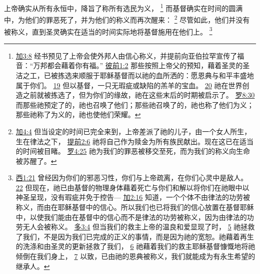 \documentclass[12pt, a4paper, oneside]{ctexart}
\newcounter{parnum}[section]
\newcommand{\N}{%
   \noindent\refstepcounter{parnum}%
    \makebox[\parindent][l]{\textbf{\arabic{parnum}.}}}
\begin{document}
\N 上帝确实从所有永恒中，降旨了称所有选民为义，
	\footnote {
		\href{https://biblehub.com/galatians/3-8.htm}{加3:8} 经书预见了上帝会使外邦人由信心称义，并提前向亚伯拉罕宣传了福音：“万邦都会藉着你有福。”
		\href{https://biblehub.com/1_peter/1-2.htm}{彼前1:2} 那些按照上帝父的预知，藉着圣灵的圣洁之工，已被拣选来顺服于耶稣基督而以祂的血所洒的：愿恩典与和平丰盛地属于你们。
		\href{https://biblehub.com/1_peter/1-19.htm}{19} 但以基督，一只无瑕疵或缺陷的羔羊的宝血。
		\href{https://biblehub.com/1_peter/1-20.htm}{20} 祂在世界创造之前就被拣选了，但为你们的缘故，祂在这些末后的时期被启示了。
		\href{https://biblehub.com/romans/8-30.htm}{罗8:30} 而那些祂预定了的，祂也召唤了他们；那些祂召唤了的，祂也称了他们为义；那些祂称了为义的，祂也使他们荣耀。
	}
	而基督确实在时间的圆满中，为他们的罪恶死了，并为他们的称义而再次醒来：
	\footnote {
		\href{https://biblehub.com/galatians/4-4.htm}{加4:4} 但当设定的时间已完全来到，上帝差派了祂的儿子，由一个女人所生，生在律法之下，
		\href{https://biblehub.com/1_timothy/2-6.htm}{提前2:6} 祂将自己作为赎金为所有族民献出。现在这已在适当的时间被目睹。
		\href{https://biblehub.com/romans/4-25.htm}{罗4:25} 祂为我们的罪恶被移交至死，而为我们的称义向生命被苏醒了。
	}
	尽管如此，他们并没有被称义，直到圣灵确实在适当的时间实际地将基督施用在他们上。
	\footnote {
		\href{https://biblehub.com/colossians/1-21.htm}{西1:21} 曾经因为你们的邪恶习性，你们与上帝疏离，在你们心灵中是敌人。
		\href{https://biblehub.com/colossians/1-22.htm}{22} 但现在，祂已由基督的物理身体藉着死亡与你们和解以将你们在祂眼中以神圣呈现，没有瑕疵并免于控告---
		\href{https://biblehub.com/galatians/2-16.htm}{加2:16} 知道，一个个体不由律法的功劳被称义，而由在耶稣基督中的信心。所以我们也已将我们的信心放置在基督耶稣中，以使我们能由在基督中的信心而不是律法的功劳被称义，因为由律法的功劳无人会被称义。
		\href{https://biblehub.com/titus/3-4.htm}{多3:4} 但当我们的救主上帝的温良和爱显现了时，
		\href{https://biblehub.com/titus/3-5.htm}{5} 祂拯救了我们，不是因为我们已完成的正义的事情，而是因为祂的宽恕。祂藉着再生的洗涤和由圣灵的更新拯救了我们，
		\href{https://biblehub.com/titus/3-6.htm}{6} 祂藉着我们的救主耶稣基督慷慨地将祂倾倒在我们身上，
		\href{https://biblehub.com/titus/3-7.htm}{7} 以致，已由祂的恩典被称义，我们就能成为有永生希望的继承人。
	}
\end{document}
